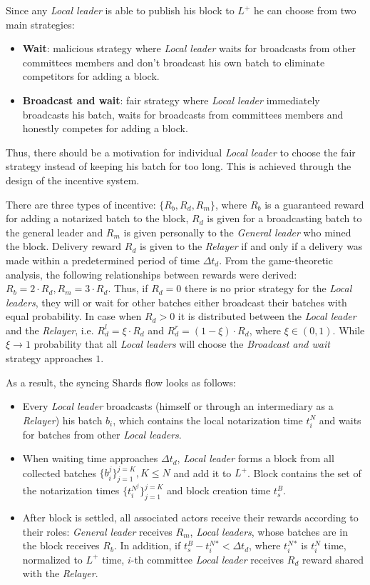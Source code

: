 Since any \emph{Local leader} is able to publish his block to $L^+$ he can choose from two main strategies:
\begin{itemize}
    \item \textbf{Wait}: malicious strategy where \emph{Local leader} waits for broadcasts from other committees members and don't broadcast his own batch to eliminate competitors for adding a block.
    \item \textbf{Broadcast and wait}: fair strategy where \emph{Local leader} immediately broadcasts his batch, waits for broadcasts from committees members and honestly competes for adding a block.
\end{itemize}
Thus, there should be a motivation for individual \emph{Local leader} to choose the fair strategy instead of keeping his batch for too long.
This is achieved through the design of the incentive system.

There are three types of incentive: ${\{R_b, R_d, R_m\}}$, where $R_b$ is a guaranteed reward for adding a notarized batch to the block, $R_d$ is given for a broadcasting batch to the general leader and $R_m$ is given personally to the \emph{General leader} who mined the block.
Delivery reward $R_d$ is given to the \emph{Relayer} if and only if a delivery was made within a predetermined period of time $\Delta t_d$.
From the game-theoretic analysis, the following relationships between rewards were derived: ${R_b = 2 \cdot R_d, R_m = 3 \cdot R_d}$.
Thus, if ${R_d=0}$ there is no prior strategy for the \emph{Local leaders}, they will or wait for other batches either broadcast their batches with equal probability.
In case when ${R_d>0}$ it is distributed between the \emph{Local leader} and the \emph{Relayer}, i.e. ${R^l_d = \xi \cdot R_d}$ and  ${R^r_d = (1 - \xi) \cdot R_d}$, where ${\xi \in (0, 1)}$.
While ${\xi \rightarrow 1}$ probability that all \emph{Local leaders} will choose the \emph{Broadcast and wait} strategy approaches $1$.

As a result, the syncing Shards flow looks as follows:
\begin{itemize}
    \item Every \emph{Local leader} broadcasts (himself or through an intermediary as a \emph{Relayer}) his batch $b_i$, which contains the local notarization time $t^N_i$ and waits for batches from other \emph{Local leaders}.
    \item When waiting time approaches $\Delta t_d$, \emph{Local leader} forms a block from all collected batches ${\{b_i^j\}_{j=1}^{j=K}, K \le N}$ and add it to $L^+$.
    Block contains the set of the notarization times $\{t^{N^j}_i\}_{j=1}^{j=K}$ and block creation time $t^B_s$.
    \item After block is settled, all associated actors receive their rewards according to their roles: \emph{General leader} receives $R_m$, \emph{Local leaders}, whose batches are in the block receives $R_b$.
    In addition, if ${t^B_s - t^N_i^* < \Delta t_d}$, where $t^N_i^*$ is $t^N_i$ time, normalized to $L^+$ time, $i$-th committee \emph{Local leader} receives $R_d$ reward shared with the \emph{Relayer}.
\end{itemize}

